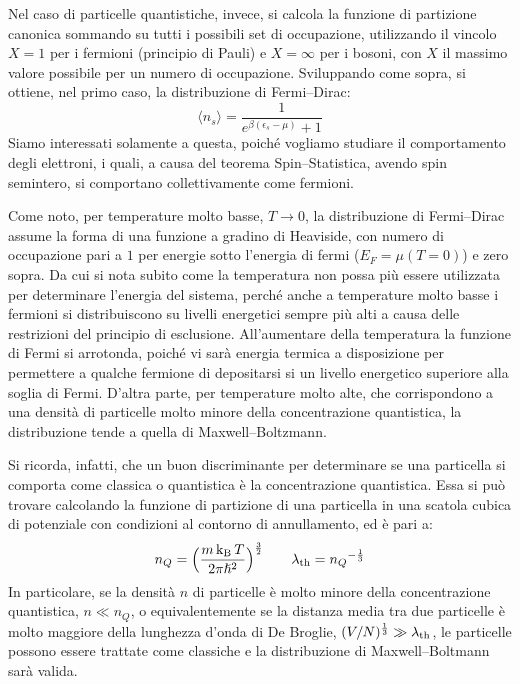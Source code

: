 Nel caso di particelle quantistiche, invece, si calcola la funzione di partizione canonica sommando su tutti i possibili set di occupazione, utilizzando il vincolo $X=1$ per i fermioni (principio di Pauli) e $X=\infty$ per i bosoni, con $X$ il massimo valore possibile per un numero di occupazione. Sviluppando come sopra, si ottiene, nel primo caso, la distribuzione di Fermi--Dirac:
\begin{equation}
    \langle n_s \rangle = \dfrac{1}{e^{\beta(\epsilon_s - \mu)} + 1}
\end{equation}
Siamo interessati solamente a questa, poiché vogliamo studiare il comportamento degli elettroni, i quali, a causa del teorema Spin--Statistica, avendo spin semintero, si comportano collettivamente come fermioni.

Come noto, per temperature molto basse, $T \to 0$, la distribuzione di Fermi--Dirac assume la forma di una funzione a gradino di Heaviside, con numero di occupazione pari a $1$ per energie sotto l'energia di fermi ($E_F = \mu(T=0)$) e zero sopra. Da cui si nota subito come la temperatura non possa più essere utilizzata per determinare l'energia del sistema, perché anche a temperature molto basse i fermioni si distribuiscono su livelli energetici sempre più alti a causa delle restrizioni del principio di esclusione. All'aumentare della temperatura la funzione di Fermi si arrotonda, poiché vi sarà energia termica a disposizione per permettere a qualche fermione di depositarsi si un livello energetico superiore alla soglia di Fermi. D'altra parte, per temperature molto alte, che corrispondono a una densità di particelle molto minore della concentrazione quantistica, la distribuzione tende a quella di Maxwell--Boltzmann.

Si ricorda, infatti, che un buon discriminante per determinare se una particella si comporta come classica o quantistica è la concentrazione quantistica. Essa si può trovare calcolando la funzione di partizione di una particella in una scatola cubica di potenziale con condizioni al contorno di annullamento, ed è pari a:
\begin{equation}\label{eq:concentrazione-quantistica}
    n_Q = \Bigl( \dfrac{m \operatorname{k_B} T}{2 \pi {\hslash}^2}  \Bigr)^\frac{3}{2} \qquad \lambda_\textup{th} = {n_Q}^{-\frac{1}{3}} 
\end{equation}
In particolare, se la densità $n$ di particelle è molto minore della concentrazione quantistica, $n \ll n_Q$, o equivalentemente se la distanza media tra due particelle è molto maggiore della lunghezza d'onda di De Broglie, $(V/N)^\frac{1}{3} \gg \lambda_\textup{th}$, le particelle possono essere trattate come classiche e la distribuzione di Maxwell--Boltmann sarà valida.

